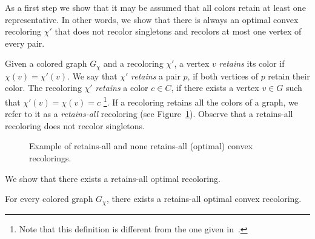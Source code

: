 As a first step we show that it may be assumed that all 
colors retain at least one representative.
%
In other words,
we show that there is always an optimal convex recoloring $\chi'$ 
that does not recolor singletons and recolors at most one vertex of every pair. 

Given a colored graph $G_\chi$ and a recoloring $\chi'$, 
a vertex $v$ \emph{retains} its color if $\chi(v)=\chi'(v)$. 
%
We say that $\chi'$ \emph{retains} a pair $p$, 
if both vertices of $p$ retain their color.  
%
The recoloring $\chi'$ \emph{retains} a color $c \in C$,
if there exists a vertex $v \in G$ such that ${\chi'(v) = \chi(v) = c}$
\footnote{
Note that this definition is different from the one given
in~\cite{kanj2009convex}.
}.
%
If a recoloring retains all the colors of a graph, 
we refer to it as a \emph{retains-all} recoloring (see Figure~\ref{fig:retains-all}).
Observe that a retains-all recoloring does not recolor singletons.

\begin{figure}
\centering

\caption{
\label{fig:retains-all}
Example of retains-all and none retains-all (optimal) convex recolorings.
}
\end{figure}
%
We show that there exists a retains-all optimal recoloring.

\begin{lemma}
\label{lm:retains-all}
For every colored graph $G_\chi$, 
there exists a retains-all optimal convex recoloring.
\end{lemma}

